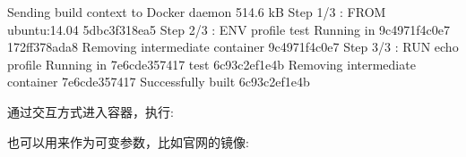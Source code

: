 \documentclass[letterpaper,10pt,english]{sphinxmanual}
\begin{document}
\begin{itemize}
\begin{sphinxVerbatim}[commandchars=\\\{\}]
Sending build context to Docker daemon 514.6 kB
Step 1/3 : FROM ubuntu:14.04
 \PYGZhy{}\PYGZhy{}\PYGZhy{}\PYGZgt{} 5dbc3f318ea5
Step 2/3 : ENV profile test
 \PYGZhy{}\PYGZhy{}\PYGZhy{}\PYGZgt{} Running in 9c4971f4c0e7
 \PYGZhy{}\PYGZhy{}\PYGZhy{}\PYGZgt{} 172ff378ada8
Removing intermediate container 9c4971f4c0e7
Step 3/3 : RUN echo \PYGZdl{}profile
 \PYGZhy{}\PYGZhy{}\PYGZhy{}\PYGZgt{} Running in 7e6cde357417
test
 \PYGZhy{}\PYGZhy{}\PYGZhy{}\PYGZgt{} 6c93c2ef1e4b
Removing intermediate container 7e6cde357417
Successfully built 6c93c2ef1e4b
\end{sphinxVerbatim}

通过交互方式进入容器，执行:

\begin{sphinxVerbatim}[commandchars=\\\{\}]
\end{sphinxVerbatim}

也可以用来作为可变参数，比如官网的镜像:

\begin{sphinxVerbatim}[commandchars=\\\{\}]
  


\end{sphinxVerbatim}
\end{itemize}
\end{document}
